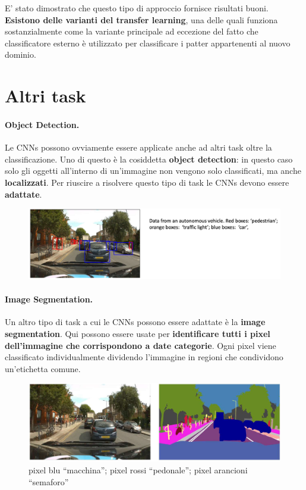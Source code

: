 E' stato dimostrato che questo tipo di approccio fornisce risultati buoni.
\newline
\newline
\textbf{Esistono delle varianti del transfer learning}, una delle quali funziona sostanzialmente come la variante principale ad eccezione del fatto che classificatore esterno è utilizzato per classificare i patter appartenenti al nuovo dominio.
\newpage
\section{Altri task}
\paragraph{Object Detection.} Le CNNs possono ovviamente essere applicate anche ad altri task oltre la classificazione. Uno di questo è la cosiddetta \textbf{object detection}: in questo caso solo gli oggetti all'interno di un'immagine non vengono solo classificati, ma anche \textbf{localizzati}. Per riuscire a risolvere questo tipo di task le CNNs devono essere \textbf{adattate}.
\begin{figure}[!h]
    \includegraphics[scale=.5]{images/cnn/obj_det.png}
    \centering
\end{figure}



\paragraph{Image Segmentation.} Un altro tipo di task a cui le CNNs possono essere adattate è la \textbf{image segmentation}. Qui possono essere usate per \textbf{identificare tutti i pixel dell'immagine che corrispondono a date categorie}. Ogni pixel viene classificato individualmente dividendo l'immagine in regioni che condividono un'etichetta comune. 
\begin{figure}[!h]
    \includegraphics[scale=.45]{images/cnn/img_segm.png}
    \caption{pixel blu “macchina”; pixel rossi “pedonale”; pixel arancioni “semaforo”}
    \centering
\end{figure}



